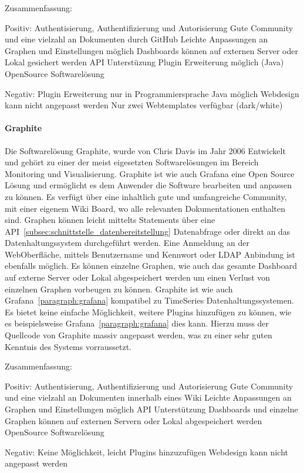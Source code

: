 Zusammenfassung:

\begin{outline}
  Positiv:
  \1 Authentisierung, Authentifizierung und Autorisierung
  \1 Gute Community und eine vielzahl an Dokumenten durch GitHub
  \1 Leichte Anpassungen an Graphen und Einstellungen möglich
  \1 Dashboards können auf externen Server oder Lokal gesichert werden
  \1 API Unterstüzung
  \1 Plugin Erweiterung möglich (Java)
  \1 OpenSource Softwarelösung

  Negativ:
  \1 Plugin Erweiterung nur in Programmiersprache Java möglich
  \1 Webdesign kann nicht angepasst werden
  \1 Nur zwei Webtemplates verfügbar (dark/white)
\end{outline}

\paragraph{Graphite}
\label{paragraph:graphite}
Die Softwarelösung Graphite, wurde von Chris Davis im Jahr 2006 Entwickelt und
gehört zu einer der meist eigesetzten Softwarelösungen im Bereich Monitoring
und Visualisierung. Graphite ist wie auch Grafana eine Open Source Lösung und
ermöglicht es dem Anwender die Software bearbeiten und anpassen zu können. Es
verfügt über eine inhaltlich gute und umfangreiche Community, mit einer eigenem
Wiki Board, wo alle relevanten Dokumentationen enthalten sind. Graphen können
leicht mittelts Statements über eine
API~\ref{subsec:schnittstelle_datenbereitstellung} Datenabfrage oder direkt an das
Datenhaltungssystem durchgeführt werden. Eine Anmeldung an der WebOberfläche,
mittels Benutzername und Kennwort oder \gls{LDAP} Anbindung ist ebenfalls
möglich. Es können einzelne Graphen, wie auch das gesamte Dashboard auf externe
Server oder Lokal abgespeichert werden um einen Verlust von einzelnen Graphen
vorbeugen zu können. Graphite ist wie auch Grafana~\ref{paragraph:grafana}
kompatibel zu TimeSeries Datenhaltungssystemen. Es bietet keine einfache
Möglichkeit, weitere Plugins hinzufügen zu können, wie es beispielsweise
Grafana~\ref{paragraph:grafana} dies kann. Hierzu muss der Quellcode von
Graphite massiv angepasst werden, was zu einer sehr guten Kenntnis des Systems
vorraussetzt.


Zusammenfassung:

\begin{outline}
  Positiv:
  \1 Authentisierung, Authentifizierung und Autorisierung
  \1 Gute Community und eine vielzahl an Dokumenten innerhalb eines Wiki
  \1 Leichte Anpassungen an Graphen und Einstellungen möglich
  \1 API Unterstützung
  \1 Dashboards und einzelne Graphen können auf externen Servern oder Lokal
  abgespeichert werden
  \1 OpenSource Softwarelösung


  Negativ:
  \1 Keine Möglichkeit, leicht Plugins hinzuzufügen
  \1 Webdesign kann nicht angepasst werden
\end{outline}


